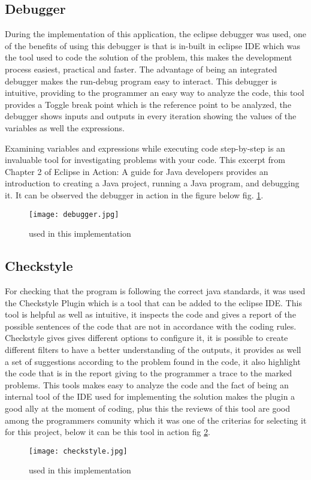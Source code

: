 \documentclass[12pt]{article}
\begin{document}
\subsection{Debugger}
During the implementation of this application, the eclipse debugger was used, one of the benefits of using this debugger is that is in-built in eclipse IDE which was the tool used to code the solution of the problem, this makes the development process easiest, practical and faster. The advantage of being an integrated debugger makes the run-debug program easy to interact.
\break
This debugger is intuitive, providing to the programmer an easy way to analyze the code, this tool provides a Toggle break point which is the reference point to be analyzed, the debugger shows inputs and outputs in every iteration showing the values of the variables as well the expressions. 

 Examining variables and expressions while executing code step-by-step is an invaluable tool for investigating problems with your code. This excerpt from Chapter 2 of Eclipse in Action: A guide for Java developers provides an introduction to creating a Java project, running a Java program, and debugging it.
 It can be observed the debugger in action in the figure below fig. \ref{fig3}.
 

 \begin{figure}[h]
    \centering
    \texttt{[image: debugger.jpg]}
    \caption{used in this implementation}
    \label{fig3}
\end{figure}

\subsection{Checkstyle}

For checking that the program is following the correct java standards, it was used the Checkstyle Plugin which is a tool that can be added to the eclipse IDE. This tool is helpful as well as intuitive, it inspects the code and gives a report of the possible sentences of the code that are not in accordance with the coding rules. Checkstyle gives gives different options to configure it, it is possible to create different filters to have a better understanding of the outputs, it provides as well a set of suggestions according to the problem found in the code, it also highlight the code that is in the report giving to the programmer a trace to the marked problems.
\break
This tools makes easy to analyze the code and the fact of being an internal tool of the IDE used for implementing the solution makes the plugin a good ally at the moment of coding, plus this the reviews of this tool are good among the programmers comunity which it was one of the criterias for selecting it for this project, below it can be this tool in action fig \ref{fig4}.

\begin{figure}[h]
    \centering
    \texttt{[image: checkstyle.jpg]}
    \caption{used in this implementation}
    \label{fig4}
\end{figure}
\end{document}
